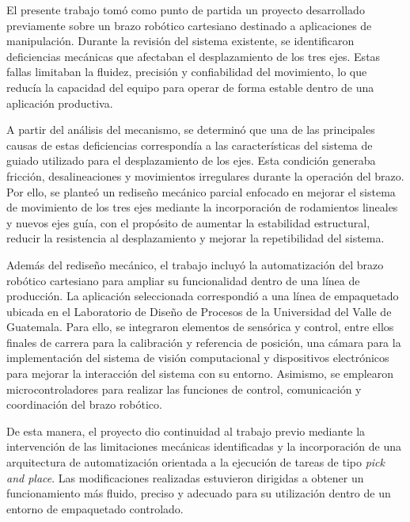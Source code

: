 El presente trabajo tomó como punto de partida un proyecto desarrollado previamente sobre un brazo robótico cartesiano destinado a aplicaciones de manipulación. Durante la revisión del sistema existente, se identificaron deficiencias mecánicas que afectaban el desplazamiento de los tres ejes. Estas fallas limitaban la fluidez, precisión y confiabilidad del movimiento, lo que reducía la capacidad del equipo para operar de forma estable dentro de una aplicación productiva.

A partir del análisis del mecanismo, se determinó que una de las principales causas de estas deficiencias correspondía a las características del sistema de guiado utilizado para el desplazamiento de los ejes. Esta condición generaba fricción, desalineaciones y movimientos irregulares durante la operación del brazo. Por ello, se planteó un rediseño mecánico parcial enfocado en mejorar el sistema de movimiento de los tres ejes mediante la incorporación de rodamientos lineales y nuevos ejes guía, con el propósito de aumentar la estabilidad estructural, reducir la resistencia al desplazamiento y mejorar la repetibilidad del sistema.

Además del rediseño mecánico, el trabajo incluyó la automatización del brazo robótico cartesiano para ampliar su funcionalidad dentro de una línea de producción. La aplicación seleccionada correspondió a una línea de empaquetado ubicada en el Laboratorio de Diseño de Procesos de la Universidad del Valle de Guatemala. Para ello, se integraron elementos de sensórica y control, entre ellos finales de carrera para la calibración y referencia de posición, una cámara para la implementación del sistema de visión computacional y dispositivos electrónicos para mejorar la interacción del sistema con su entorno. Asimismo, se emplearon microcontroladores para realizar las funciones de control, comunicación y coordinación del brazo robótico.

De esta manera, el proyecto dio continuidad al trabajo previo mediante la intervención de las limitaciones mecánicas identificadas y la incorporación de una arquitectura de automatización orientada a la ejecución de tareas de tipo \textit{pick and place}. Las modificaciones realizadas estuvieron dirigidas a obtener un funcionamiento más fluido, preciso y adecuado para su utilización dentro de un entorno de empaquetado controlado.